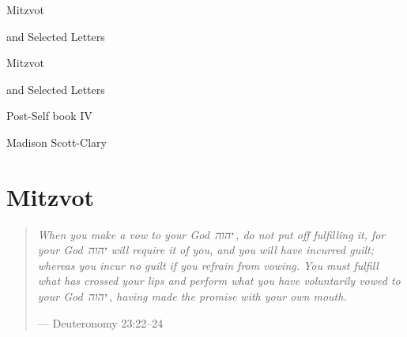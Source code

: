 \documentclass[11pt]{memoir}
\begin{document}
  \frontmatter

  \thispagestyle{empty}
  \null
  \vfill
  \begin{flushright}
    \DisplayFont Mitzvot
    
    \vspace{1ex}

    {\footnotesize and Selected Letters}
  \end{flushright}
  \vfill
  \cleardoublepage

  \pagestyle{plain}

  \doublespacing

  \begin{flushright}
    \null
    \vfill
    {\Huge\DisplayFont Mitzvot}

    \vspace{1ex}

    {\Large\DisplayFont and Selected Letters}

    {\DisplayFont Post-Self book IV}

    \vfill

    {\Large\DisplayFont Madison Scott-Clary}
  \end{flushright}
  \thispagestyle{empty}

  \newpage

  

  \tableofcontents*
  \newpage
  \null
  \cleardoublepage



  \mainmatter

  \pagestyle{ourbook}

  \part*{Mitzvot}

  \cleardoublepage
  \null
  \thispagestyle{empty}
  \vfill
  \begin{quote}
    \small
    \emph{When you make a vow to your God~{\HebFont יהוה}\,, do not put off fulfilling it, for your God~{\HebFont יהוה} will require it of you, and you will have incurred guilt; whereas you incur no guilt if you refrain from vowing. You must fulfill what has crossed your lips and perform what you have voluntarily vowed to your God~{\HebFont יהוה}\,, having made the promise with your own mouth.}

    --- Deuteronomy 23:22--24
  \end{quote}
  \vfill
\end{document}
